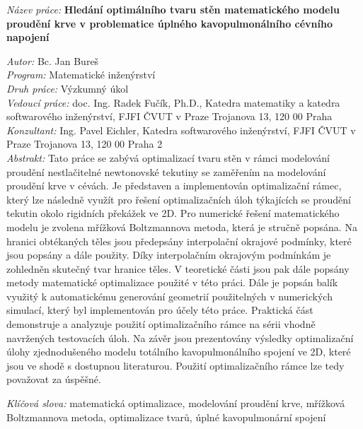 \begin{onehalfspace}
\noindent \emph{Název práce:}
\noindent \textbf{Hledání optimálního tvaru stěn matematického modelu proudění krve v problematice úplného kavopulmonálního cévního napojení}
\end{onehalfspace}
\noindent \emph{Autor:} Bc. Jan Bureš\\[2pt]
\noindent \emph{Program:} Matematické inženýrství\\[2pt]
\noindent \emph{Druh práce:} Výzkumný úkol\\[2pt]
\noindent \emph{Vedoucí práce:} doc. Ing. Radek Fučík, Ph.D.,
Katedra matematiky a katedra softwarového inženýrství, FJFI ČVUT v Praze
Trojanova 13, 120 00 Praha\\[2pt]
\noindent \emph{Konzultant:} Ing. Pavel Eichler, Katedra softwarového inženýrství, FJFI ČVUT v Praze
Trojanova 13, 120 00 Praha 2\\[2pt]
\noindent \emph{Abstrakt:} Tato práce se zabývá optimalizací tvaru stěn v rámci modelování proudění nestlačitelné newtonovské tekutiny se zaměřením na modelování proudění krve v cévách. Je představen a implementován optimalizační rámec, který lze následně využít pro řešení optimalizačních úloh týkajících se proudění tekutin okolo rigidních překážek ve 2D. Pro numerické řešení matematického modelu je zvolena mřížková Boltzmannova metoda, která je stručně popsána.
Na hranici obtékaných těles jsou předepsány interpolační okrajové podmínky, které jsou popsány a dále použity. Díky interpolačním okrajovým podmínkám je zohledněn skutečný tvar hranice těles.
V teoretické části jsou pak dále popsány metody matematické optimalizace použité v této práci. Dále je popsán balík využitý k automatickému generování geometrií použitelných v numerických simulací, který byl implementován pro účely této práce. Praktická část demonstruje a analyzuje použití optimalizačního rámce na sérii vhodně navržených testovacích úloh. Na závěr jsou prezentovány výsledky optimalizační úlohy zjednodušeného modelu totálního kavopulmonálního spojení ve 2D, které jsou ve shodě s dostupnou literaturou. Použití optimalizačního rámce lze tedy považovat za úspěšné.

\bigskip{}

\noindent \emph{Klíčová slova:} matematická optimalizace, modelování proudění krve, mřížková Boltzmannova metoda, optimalizace tvarů, úplné kavopulmonární spojení
\vfill{}
~

